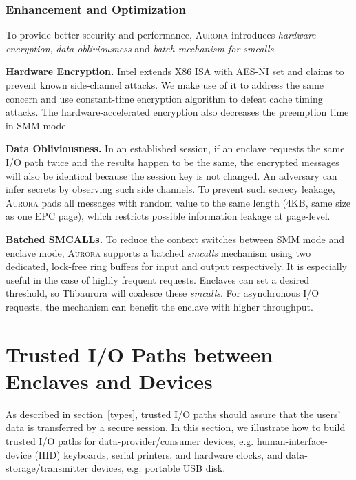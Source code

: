 \subsubsection{Enhancement and Optimization}
To provide better security and performance, \textsc{Aurora} introduces \textit{hardware encryption}, \textit{data obliviousness} and \textit{batch mechanism for smcalls}.

\textbf{Hardware Encryption.}
Intel extends X86 ISA with AES-NI set and claims to prevent known side-channel attacks. We make use of it to address the same concern and use constant-time encryption algorithm to defeat cache timing attacks. The hardware-accelerated encryption also decreases the preemption time in SMM mode.

\textbf{Data Obliviousness.}
In an established session, if an enclave requests the same I/O path twice and the results happen to be the same, the encrypted messages will also be identical because the session key is not changed. An adversary can infer secrets by observing such side channels. To prevent such secrecy leakage, \textsc{Aurora} pads all messages with random value to the same length (4KB, same size as one EPC page), which restricts possible information leakage at page-level. %

\textbf{Batched SMCALLs.}\label{batch}
To reduce the context switches between SMM mode and enclave mode, \textsc{Aurora} supports a batched \textit{smcalls} mechanism using two dedicated, lock-free ring buffers for input and output respectively. It is especially useful in the case of highly frequent requests. Enclaves can set a desired threshold, so Tlibaurora will coalesce these \textit{smcalls}. For asynchronous I/O requests, the mechanism can benefit the enclave with higher throughput. %


\section{Trusted I/O Paths between Enclaves and Devices}\label{tpaths}

As described in section~\autoref{types},  trusted I/O paths  should assure that the users' data is transferred by a secure session. 
In this section, we illustrate how to build trusted I/O paths for data-provider/consumer devices, e.g. human-interface-device (HID) keyboards, serial printers, and hardware clocks, and data-storage/transmitter devices, e.g. portable USB disk.

